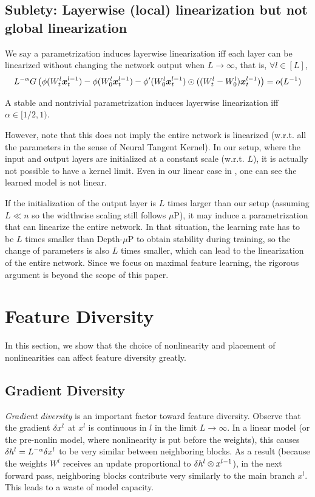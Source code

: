 \documentclass{article}
\theoremstyle{plain}
\theoremstyle{definition}
\begin{document}
\subsection{Sublety: Layerwise (local) linearization but not global linearization}

\begin{defn}\label{defn:layerwise-linearization}
    We say a parametrization induces layerwise linearization iff each layer can be linearized without changing the network output when $L\to \infty$, that is, $\forall l\in [L]$, 
    \[L^{-\alpha}G\left(\phi(W^l_t\boldsymbol{x}_t^{l-1})-\phi( W^l_0\boldsymbol{x}_t^{l-1}) - \phi'(W_0^l\boldsymbol{x}_t^{l-1})\odot ((W_t^l-W_0^l)\boldsymbol{x}_t^{l-1})\right) = o(L^{-1})\]
\end{defn}

\begin{claim}\label{clm:layerwise-linearization}
    A stable and nontrivial parametrization induces layerwise linearization iff $\alpha \in [1/2, 1)$.
\end{claim}

However, note that this does not imply the entire network is linearized (w.r.t. all the parameters in the sense of Neural Tangent Kernel).
In our setup, where the input and output layers are initialized at a constant scale (w.r.t. $L$), it is actually not possible to have a kernel limit. Even in our linear case in , one can see the learned model is not linear. 

If the initialization of the output layer is $L$ times larger than our setup (assuming $L\ll n$ so the widthwise scaling still follows $\mu$P), it may induce a parametrization that can linearize the entire network. In that situation, the learning rate has to be $L$ times smaller than Depth-$\mu$P to obtain stability during training, so the change of parameters is also $L$ times smaller, which can lead to the linearization of the entire network. Since we focus on maximal feature learning, the rigorous argument is beyond the scope of this paper.

 
\section{Feature Diversity}
In this section, we show that the choice of nonlinearity and placement of nonlinearities can affect feature diversity greatly.

\subsection{Gradient Diversity}
\emph{Gradient diversity} is an important factor toward feature diversity. Observe that the gradient $\delta x^l$ at $x^l$  is continuous in $l$ in the limit $L \to \infty$.  In a linear model (or the pre-nonlin model, where nonlinearity is put before the weights), this causes $\delta h^l = L^{-\alpha}\delta x^l$ to be very similar between neighboring blocks. As a result (because the weights $W^l$  receives an update proportional to $\delta h^l \otimes x^{l-1}$), in the next forward pass, neighboring blocks contribute very similarly to the  main branch $x^l$. This leads to a waste of model capacity.
\end{document}
